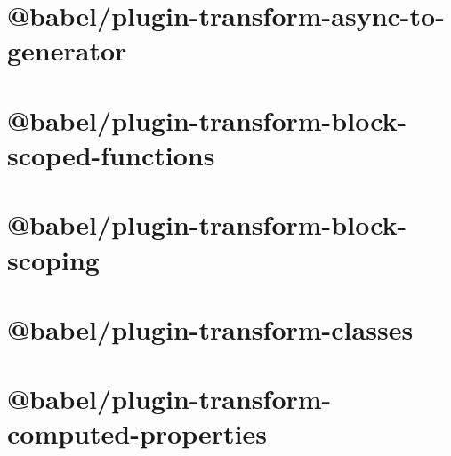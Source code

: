 \documentclass[twoside]{book}
\newcommand{\+}{\discretionary{\mbox{\scriptsize$\hookleftarrow$}}{}{}}
\begin{document}
\chapter{@babel/plugin-\/transform-\/async-\/to-\/generator}
\label{md__c___users_vaishnavi_jadhav__desktop__developer_code_mean_stack_example_client_node_modules__6f380a866ab0e1f578b527882f40683f}

\chapter{@babel/plugin-\/transform-\/block-\/scoped-\/functions}
\label{md__c___users_vaishnavi_jadhav__desktop__developer_code_mean_stack_example_client_node_modules__8af591583e377ac88ade4010c83f179b}

\chapter{@babel/plugin-\/transform-\/block-\/scoping}
\label{md__c___users_vaishnavi_jadhav__desktop__developer_code_mean_stack_example_client_node_modules__23dc91722a9ca681275875fda7920e65}

\chapter{@babel/plugin-\/transform-\/classes}
\label{md__c___users_vaishnavi_jadhav__desktop__developer_code_mean_stack_example_client_node_modules__ceb3b41317021eae5180185b6ad4bd0e}

\chapter{@babel/plugin-\/transform-\/computed-\/properties}
\label{md__c___users_vaishnavi_jadhav__desktop__developer_code_mean_stack_example_client_node_modules__5564a39bee9b075404f225fb5b1ed2a0}

\end{document}

